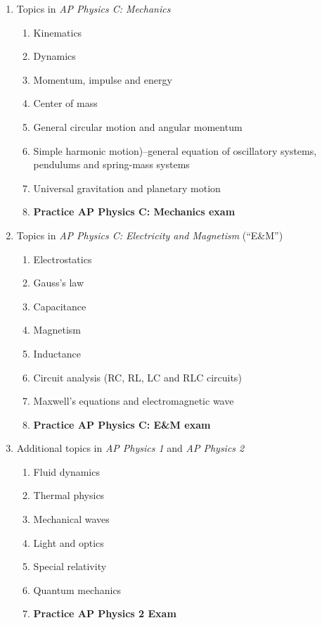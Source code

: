 \documentclass[11pt]{article}
\begin{document}
\begin{enumerate}[itemsep=.1ex,leftmargin=15pt]
\item Topics in \emph{AP Physics C: Mechanics}
  \begin{enumerate}[itemsep=0pt,leftmargin=18pt]
  \item Kinematics
  \item Dynamics
  \item Momentum, impulse and energy
  \item Center of mass
  \item General circular motion and angular momentum
  \item Simple harmonic motion)--general equation of oscillatory systems,
    pendulums and spring-mass systems
  \item Universal gravitation and planetary motion
  \item\textbf{Practice AP Physics C: Mechanics exam}
  \end{enumerate}
\item Topics in \emph{AP Physics C: Electricity and Magnetism} (``E\&M'')
  \begin{enumerate}[itemsep=0pt,leftmargin=18pt]
  \item Electrostatics
  \item Gauss's law
  \item Capacitance
  \item Magnetism
  \item Inductance
  \item Circuit analysis (RC, RL, LC and RLC circuits)
  \item Maxwell's equations and electromagnetic wave
  \item\textbf{Practice AP Physics C: E\&M exam}
  \end{enumerate}
\item Additional topics in \emph{AP Physics 1} and \emph{AP Physics 2}
  \begin{enumerate}[itemsep=0pt,leftmargin=18pt]
  \item Fluid dynamics
  \item Thermal physics
  \item Mechanical waves
  \item Light and optics
  \item Special relativity
  \item Quantum mechanics
  \item\textbf{Practice AP Physics 2 Exam}
  \end{enumerate}
\end{enumerate}
\end{document}
